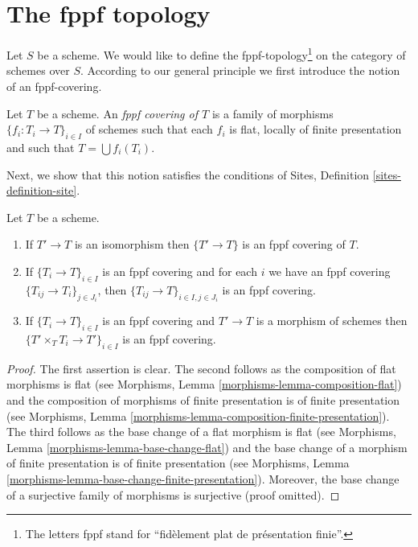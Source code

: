 \section{The fppf topology}
\label{section-fppf}

\noindent
Let $S$ be a scheme. We would like to define the fppf-topology\footnote{
The letters fppf stand for ``fid\`element plat de pr\'esentation finie''.} on
the category of schemes over $S$. According to our general principle
we first introduce the notion of an fppf-covering.

\begin{definition}
\label{definition-fppf-covering}
Let $T$ be a scheme. An {\it fppf covering of $T$} is a family
of morphisms $\{f_i : T_i \to T\}_{i \in I}$ of schemes
such that each $f_i$ is flat, locally of finite presentation and such
that $T = \bigcup f_i(T_i)$.
\end{definition}

\noindent
Next, we show that this notion satisfies the conditions of
Sites, Definition \ref{sites-definition-site}.

\begin{lemma}
\label{lemma-fppf}
Let $T$ be a scheme.
\begin{enumerate}
\item If $T' \to T$ is an isomorphism then $\{T' \to T\}$
is an fppf covering of $T$.
\item If $\{T_i \to T\}_{i\in I}$ is an fppf covering and for each
$i$ we have an fppf covering $\{T_{ij} \to T_i\}_{j\in J_i}$, then
$\{T_{ij} \to T\}_{i \in I, j\in J_i}$ is an fppf covering.
\item If $\{T_i \to T\}_{i\in I}$ is an fppf covering
and $T' \to T$ is a morphism of schemes then
$\{T' \times_T T_i \to T'\}_{i\in I}$ is an fppf covering.
\end{enumerate}
\end{lemma}

\begin{proof}
The first assertion is clear.
The second follows as the composition of flat morphisms is flat
(see Morphisms, Lemma \ref{morphisms-lemma-composition-flat})
and the composition of morphisms of finite presentation is
of finite presentation
(see Morphisms, Lemma \ref{morphisms-lemma-composition-finite-presentation}).
The third follows as the base change of a flat morphism is flat
(see Morphisms, Lemma \ref{morphisms-lemma-base-change-flat})
and the base change of a morphism of finite presentation is
of finite presentation
(see Morphisms, Lemma \ref{morphisms-lemma-base-change-finite-presentation}).
Moreover, the base change of a surjective family of morphisms is surjective
(proof omitted).
\end{proof}

